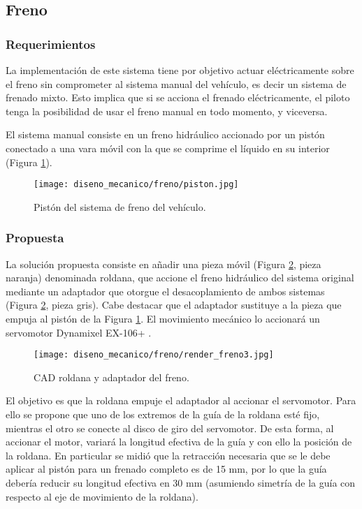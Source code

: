 \subsection{Freno}

\subsubsection{Requerimientos}
La implementación de este sistema tiene por objetivo actuar eléctricamente sobre el freno sin comprometer al sistema manual del vehículo, es decir un sistema de frenado mixto. Esto implica que si se acciona el frenado eléctricamente, el piloto tenga la posibilidad de usar el freno manual en todo momento, y viceversa.

El sistema manual consiste en un freno hidráulico accionado por un pistón conectado a una vara móvil con la que se comprime el líquido en su interior (Figura \ref{piston}).

\begin{figure}[H]
\begin{center}
	\texttt{[image: diseno\_mecanico/freno/piston.jpg]}
	\caption{Pistón del sistema de freno del vehículo.}
	\label{piston}
\end{center}
\end{figure}


\subsubsection{Propuesta}

La solución propuesta consiste en añadir una pieza móvil (Figura \ref{cad_roldana}, pieza naranja) denominada roldana, que accione el freno hidráulico del sistema original mediante un adaptador que otorgue el desacoplamiento de ambos sistemas (Figura \ref{cad_roldana}, pieza gris). Cabe destacar que el adaptador sustituye a la pieza que empuja al pistón de la Figura \ref{piston}. El movimiento mecánico lo accionará un servomotor Dynamixel EX-106+ \cite{motor_datasheet}.

\begin{figure}[H]
\begin{center}
	\texttt{[image: diseno\_mecanico/freno/render\_freno3.jpg]}
	\caption{CAD roldana y adaptador del freno.}
	\label{cad_roldana}
\end{center}
\end{figure}

El objetivo es que la roldana empuje el adaptador al accionar el servomotor. Para ello se propone que uno de los extremos de la guía de la roldana esté fijo, mientras el otro se conecte al disco de giro del servomotor. De esta forma, al accionar el motor, variará la longitud efectiva de la guía y con ello la posición de la roldana. En particular se midió que la retracción necesaria que se le debe aplicar al pistón para un frenado completo es de 15 mm, por lo que la guía debería reducir su longitud efectiva en 30 mm (asumiendo simetría de la guía con respecto al eje de movimiento de la roldana).

